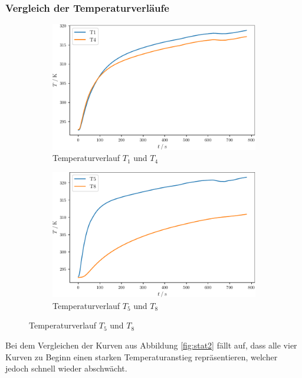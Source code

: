 \subsubsection{Vergleich der Temperaturverläufe}
\begin{figure}
  \caption{Temperaturverlauf der statischen Methode}
  \label{fig:stat2}
  \begin{subfigure}{0.48\textwidth}
    \centering
    \includegraphics[width = \textwidth]{build/stat14.pdf}
    \caption{Temperaturverlauf $T_1$ und $T_4$}
    \label{fig:stat14}
  \end{subfigure}
  \begin{subfigure}{0.48\textwidth}
    \centering
    \includegraphics[width = \textwidth]{build/stat58.pdf}
    \caption{Temperaturverlauf $T_5$ und $T_8$}
    \label{fig:stat58}
  \end{subfigure}
\end{figure}
Bei dem Vergleichen der Kurven aus Abbildung \ref{fig:stat2} fällt auf, dass alle vier Kurven zu Beginn einen starken Temperaturanstieg repräsentieren, welcher jedoch schnell wieder abschwächt.
